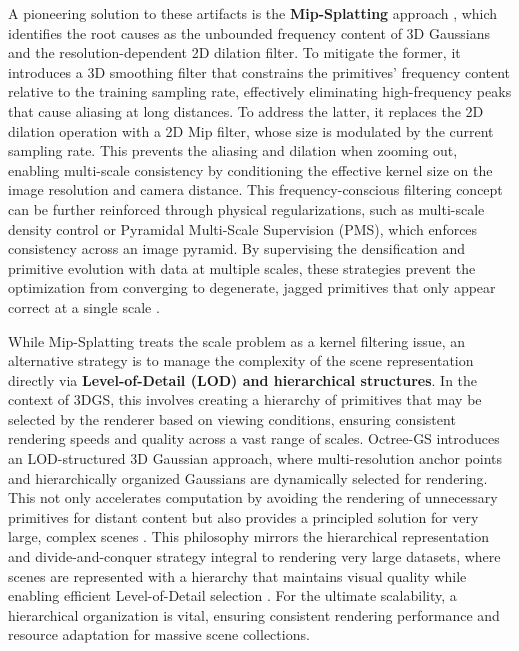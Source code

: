 \documentclass[11pt,a4paper]{article}
\begin{document}
A pioneering solution to these artifacts is the \textbf{Mip-Splatting} approach \cite{arxiv:2401.03890v2,arxiv:2407.17418v1}, which identifies the root causes as the unbounded frequency content of 3D Gaussians and the resolution-dependent 2D dilation filter. To mitigate the former, it introduces a 3D smoothing filter that constrains the primitives' frequency content relative to the training sampling rate, effectively eliminating high-frequency peaks that cause aliasing at long distances. To address the latter, it replaces the 2D dilation operation with a 2D Mip filter, whose size is modulated by the current sampling rate. This prevents the aliasing and dilation when zooming out, enabling multi-scale consistency by conditioning the effective kernel size on the image resolution and camera distance. This frequency-conscious filtering concept can be further reinforced through physical regularizations, such as multi-scale density control or Pyramidal Multi-Scale Supervision (PMS), which enforces consistency across an image pyramid. By supervising the densification and primitive evolution with data at multiple scales, these strategies prevent the optimization from converging to degenerate, jagged primitives that only appear correct at a single scale \cite{arxiv:2402.07181v1}.

While Mip-Splatting treats the scale problem as a kernel filtering issue, an alternative strategy is to manage the complexity of the scene representation directly via \textbf{Level-of-Detail (LOD) and hierarchical structures}. In the context of 3DGS, this involves creating a hierarchy of primitives that may be selected by the renderer based on viewing conditions, ensuring consistent rendering speeds and quality across a vast range of scales. Octree-GS introduces an LOD-structured 3D Gaussian approach, where multi-resolution anchor points and hierarchically organized Gaussians are dynamically selected for rendering. This not only accelerates computation by avoiding the rendering of unnecessary primitives for distant content but also provides a principled solution for very large, complex scenes \cite{arxiv:2403.17898v1}. This philosophy mirrors the hierarchical representation and divide-and-conquer strategy integral to rendering very large datasets, where scenes are represented with a hierarchy that maintains visual quality while enabling efficient Level-of-Detail selection \cite{arxiv:2406.12080v1}. For the ultimate scalability, a hierarchical organization is vital, ensuring consistent rendering performance and resource adaptation for massive scene collections.
\end{document}
